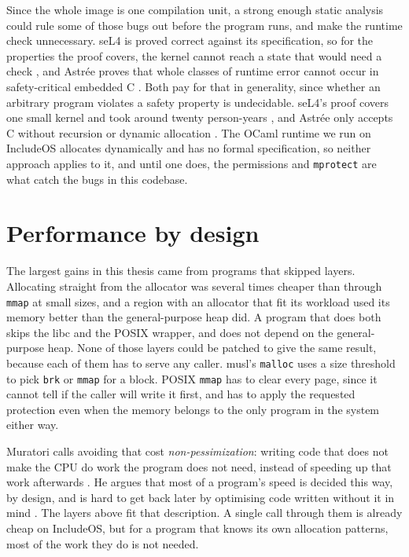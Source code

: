 \documentclass[12pt]{report}
\renewcommand{\_}{\origunderscore\allowbreak}
\begin{document}
Since the whole image is one compilation unit, a strong enough static analysis could rule some of those bugs out before the program runs, and make the runtime check unnecessary. seL4 is proved correct against its specification, so for the properties the proof covers, the kernel cannot reach a state that would need a check \cite{klein2009sel4}, and Astr\'ee proves that whole classes of runtime error cannot occur in safety-critical embedded C \cite{blanchet2003astree}. Both pay for that in generality, since whether an arbitrary program violates a safety property is undecidable. seL4's proof covers one small kernel and took around twenty person-years \cite{klein2009sel4}, and Astr\'ee only accepts C without recursion or dynamic allocation \cite{blanchet2003astree}. The OCaml runtime we run on IncludeOS allocates dynamically and has no formal specification, so neither approach applies to it, and until one does, the permissions and \texttt{mprotect} are what catch the bugs in this codebase.

\section{Performance by design}
\label{sec:discussion-design}

The largest gains in this thesis came from programs that skipped layers. Allocating straight from the allocator was several times cheaper than through \texttt{mmap} at small sizes, and a region with an allocator that fit its workload used its memory better than the general-purpose heap did. A program that does both skips the libc and the POSIX wrapper, and does not depend on the general-purpose heap. None of those layers could be patched to give the same result, because each of them has to serve any caller. musl's \texttt{malloc} uses a size threshold to pick \texttt{brk} or \texttt{mmap} for a block. POSIX \texttt{mmap} has to clear every page, since it cannot tell if the caller will write it first, and has to apply the requested protection even when the memory belongs to the only program in the system either way.

Muratori calls avoiding that cost \emph{non-pessimization}: writing code that does not make the CPU do work the program does not need, instead of speeding up that work afterwards \cite{muratori2021philosophies,young-hsopt-philosophies}. He argues that most of a program's speed is decided this way, by design, and is hard to get back later by optimising code written without it in mind \cite{muratori2023cleancode}. The layers above fit that description. A single call through them is already cheap on IncludeOS, but for a program that knows its own allocation patterns, most of the work they do is not needed.
\end{document}
